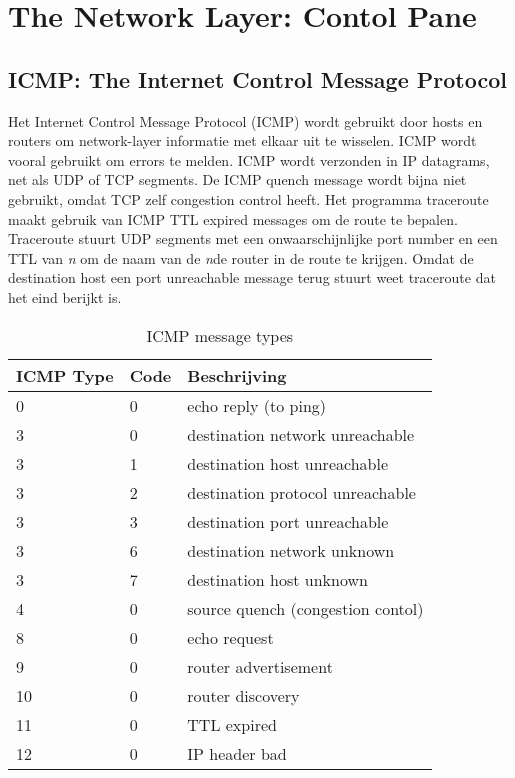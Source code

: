 \section{The Network Layer: Contol Pane}
\addtocounter{subsection}{5}
\subsection{ICMP: The Internet Control Message Protocol}
Het Internet Control Message Protocol (ICMP) wordt gebruikt door hosts en routers om network-layer informatie met elkaar uit te wisselen.
ICMP wordt vooral gebruikt om errors te melden.
ICMP wordt verzonden in IP datagrams, net als UDP of TCP segments.
De ICMP quench message wordt bijna niet gebruikt, omdat TCP zelf congestion control heeft.\newline
Het programma traceroute maakt gebruik van ICMP TTL expired messages om de route te bepalen. Traceroute stuurt UDP segments met een onwaarschijnlijke port number en een TTL van \textit{n} om de naam van de \textit{n}de router in de route te krijgen.
Omdat de destination host een port unreachable message terug stuurt weet traceroute dat het eind berijkt is.

\begin{table}[h!]
    \begin{center}
        \caption{ICMP message types}
        \label{tab:ICMP}
        \begin{tabular}{l l l}
            \textbf{ICMP Type} & \textbf{Code} & \textbf{Beschrijving}\\
            \hline
            0 & 0 & echo reply (to ping)\\ \hline
            3 & 0 & destination network unreachable\\ \hline
            3 & 1 & destination host unreachable\\ \hline
            3 & 2 & destination protocol unreachable\\ \hline
            3 & 3 & destination port unreachable\\ \hline
            3 & 6 & destination network unknown\\ \hline
            3 & 7 & destination host unknown\\ \hline
            4 & 0 & source quench (congestion contol)\\ \hline
            8 & 0 & echo request\\ \hline
            9 & 0 & router advertisement\\ \hline
            10 & 0 & router discovery\\ \hline
            11 & 0 & TTL expired\\ \hline
            12 & 0 & IP header bad\\ \hline

        \end{tabular}
    \end{center}
\end{table}
